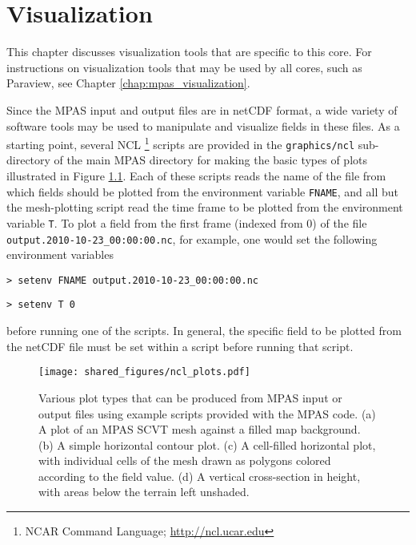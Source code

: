 
\chapter{Visualization}
\label{chap:nhyd_atm_visualization}

This chapter discusses visualization tools that are specific to this core.  For instructions on visualization tools that may be used by all cores, such as Paraview, see Chapter \ref{chap:mpas_visualization}.

Since the MPAS input and output files are in netCDF format, a wide variety of software
tools may be used to manipulate and visualize fields in these files. As a starting point, several NCL \footnote{NCAR Command Language; \url{http://ncl.ucar.edu}}
scripts are provided in the {\tt graphics/ncl} sub-directory
of the main MPAS directory for making the basic types of plots illustrated in Figure \ref{fig:ncl_plots}. Each of
these scripts reads the name of the file from which fields should be plotted from the environment variable {\tt FNAME},
and all but the mesh-plotting script read the time frame to be plotted from the environment variable {\tt T}. To plot
a field from the first frame (indexed from 0) of the file {\tt output.2010-10-23\_00:00:00.nc}, for example, one would set the 
following environment variables 

\vspace{12pt}
{\tt > setenv FNAME output.2010-10-23\_00:00:00.nc}

{\tt > setenv T 0}
\vspace{12pt}

\noindent before running one of the scripts. In general, the specific field to be plotted from the netCDF file must be set 
within a script before running that script. 

\begin{figure}[htb]
\begin{center}
\texttt{[image: shared\_figures/ncl\_plots.pdf]}
\caption{Various plot types that can be produced from MPAS input or output files using example scripts provided with the MPAS code.
(a) A plot of an MPAS SCVT mesh against a filled map background. (b) A simple horizontal contour plot. (c) A cell-filled horizontal plot, with
individual cells of the mesh drawn as polygons colored according to the field value. (d) A vertical cross-section in height, with areas below the
terrain left unshaded.}
\label{fig:ncl_plots}
\end{center}
\end{figure}


